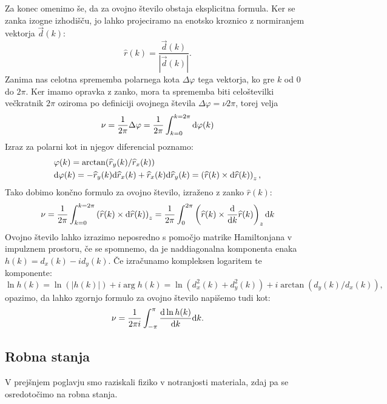 Za konec omenimo še, da za ovojno število obstaja eksplicitna formula.
Ker se zanka izogne izhodišču, jo lahko projeciramo na enotsko kroznico z normiranjem vektorja $\vec{d}(k)$:
\begin{equation}
\widehat{r}(k) = \frac{\vec{d}(k)}{|\vec{d}(k)|}.
\end{equation}
Zanima nas celotna sprememba polarnega kota $\Delta \varphi$ tega vektorja, ko gre $k$ od $0$ do $2 \pi$. Ker imamo opravka z zanko, mora ta sprememba biti celoštevilki večkratnik $2 \pi$ oziroma po definiciji ovojnega števila $\Delta \varphi = \nu 2 \pi$, torej velja
\begin{equation}
\nu = \frac{1}{2  \pi} \Delta \varphi = \frac{1}{2 \pi} \int_{k=0}^{k=2 \pi} \textup{d}\varphi(k)
\end{equation}
Izraz za polarni kot in njegov diferencial poznamo:
\begin{align}
&\varphi(k) = \arctan (\widehat{r}_y(k) / \widehat{r}_x(k)) \\
&\textup{d} \varphi(k) = - \widehat{r}_y(k) \textup{d} \widehat{r}_x(k) +  \widehat{r}_x(k) \textup{d} \widehat{r}_y(k) = \left( \widehat{r}(k) \times \textup{d} \widehat{r}(k) \right)_z,
\end{align}
Tako dobimo končno formulo za ovojno število, izraženo z zanko $\widehat{r}(k)$:
\begin{equation}
\nu = \frac{1}{2 \pi} \int_{k=0}^{k=2 \pi}  \left( \widehat{r}(k) \times \textup{d} \widehat{r}(k) \right)_z = \frac{1}{2 \pi} \int_0^{2 \pi} \left ( \widehat{r}(k) \times \frac{\textup{d}}{\textup{d} k} \widehat{r}(k) \right)_z \textup{d}k
\end{equation}
Ovojno število lahko izrazimo neposredno s pomočjo matrike Hamiltonjana v impulznem prostoru, če se spomnemo, da je naddiagonalna komponenta enaka
$h(k) = d_x (k) - i d_y(k)$. Če izračunamo kompleksen logaritem te komponente:
\begin{equation}
\ln h(k) = \ln (|h(k)|) + i \arg h(k) = \ln(d_x^2(k) + d_y^2(k)) + i \arctan (d_y(k) / d_x(k)),
\end{equation}
opazimo, da lahko zgornjo formulo za ovojno število napišemo tudi kot:
\begin{equation}
\nu = \frac{1}{2 \pi i} \int_{- \pi}^\pi \frac{\textup{d}  \ln h(k) }{\textup{d} k}\textup{d}k.
\end{equation}
\subsection{Robna stanja}
V prejšnjem poglavju smo raziskali fiziko v notranjosti materiala, zdaj pa se osredotočimo na robna stanja. 

